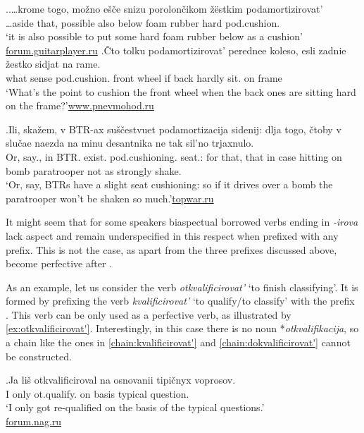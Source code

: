 \ex.\label{ex:cushion}\ag.\label{ex:cushion1}…krome togo, mo\v{z}no e\v{s}\v{c}e snizu porolon\v{c}ikom \v{z}\"{e}stkim podamortizirovat'\textsuperscript{\PF}\\		
…aside that, possible also below {foam rubber} hard pod.cushion.\\
\trans `it is also possible to put some hard foam rubber below as a cushion'\\\hbox{}\hfill\hbox{\url{forum.guitarplayer.ru}}
\bg.\label{ex:cushion2}\v{C}to tolku podamortizirovat'\textsuperscript{\IPF} perednee koleso, esli zadnie \v{z}estko sidjat na rame.\\
what sense pod.cushion. front wheel if back hardly sit. on frame\\
\trans `What's the point to cushion the front wheel when the back ones are sitting hard on the frame?'\hbox{}\hfill\hbox{\url{www.pnevmohod.ru}}

\exg.\label{ex:podamortizacija}Ili, ska\v{z}em, v BTR-ax su\v{s}\v{c}estvuet podamortizacija sidenij: dlja togo, \v{c}toby v slu\v{c}ae naezda na minu desantnika ne tak sil'no trjaxnulo.\\
Or, say., in BTR. exist. pod.cushioning. seat.: for that, that in case hitting on bomb paratrooper not as strongly shake.\\
\trans `Or, say, BTRs have a slight seat cushioning: so if it drives over a bomb the paratrooper won't be shaken so much.'\hbox{}\hfill\hbox{\url{topwar.ru}}

It might seem that for some speakers biaspectual borrowed verbs ending in \mbox{\textit{-irova}} lack aspect and remain underspecified in this respect when prefixed with any prefix. This is not the case, as apart from the three prefixes discussed above,  become perfective after . 

As an example, let us consider the verb \textit{otkvalificirovat'} `to finish classifying'. It is formed by prefixing the verb \textit{kvalificirovat'} `to qualify/to classify' with the  prefix . This verb can be only used as a perfective verb, as illustrated by \ref{ex:otkvalificirovat'}. Interestingly, in this case there is no noun *\textit{otkvalifikacija}, so a chain like the ones in \ref{chain:kvalificirovat'} and \ref{chain:dokvalificirovat'} cannot be constructed. 

\exg.\label{ex:otkvalificirovat'}Ja li\v{s} otkvalificiroval na osnovanii tipi\v{c}nyx voprosov.\\
I only ot.qualify. on basis typical question.\\
\trans `I only got re-qualified on the basis of the typical questions.'\\\hbox{}\hfill\hbox{\url{forum.nag.ru}}

